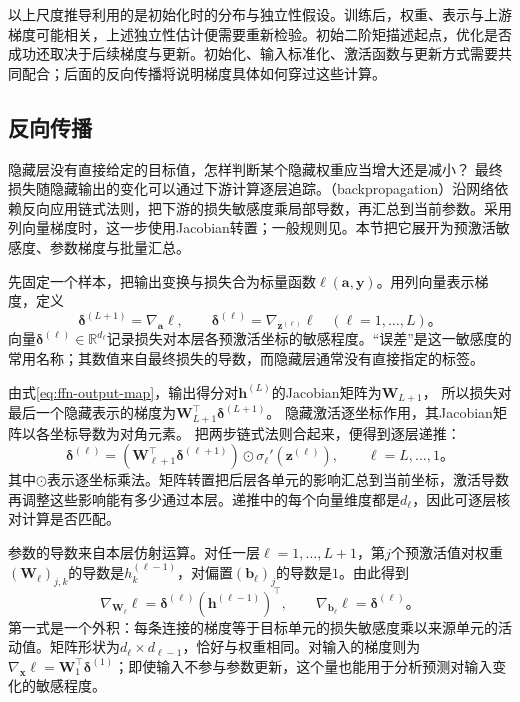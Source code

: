 以上尺度推导利用的是初始化时的分布与独立性假设。训练后，权重、表示与上游梯度可能相关，上述独立性估计便需要重新检验。初始二阶矩描述起点，优化是否成功还取决于后续梯度与更新。初始化、输入标准化、激活函数与更新方式需要共同配合；后面的反向传播将说明梯度具体如何穿过这些计算。

\subsection{反向传播}
\label{sec:ffn-backpropagation}

隐藏层没有直接给定的目标值，怎样判断某个隐藏权重应当增大还是减小？
最终损失随隐藏输出的变化可以通过下游计算逐层追踪。（backpropagation）沿网络依赖反向应用链式法则，把下游的损失敏感度乘局部导数，再汇总到当前参数。采用列向量梯度时，这一步使用Jacobian转置；一般规则见。本节把它展开为预激活敏感度、参数梯度与批量汇总。

先固定一个样本，把输出变换与损失合为标量函数$\ell(\bm{a},\bm{y})$。用列向量表示梯度，定义
\begin{equation}
  \bm{\delta}^{(L+1)}=\nabla_{\bm{a}}\ell,
  \qquad
  \bm{\delta}^{(\ell)}=\nabla_{\bm{z}^{(\ell)}}\ell
  \quad(\ell=1,\ldots,L)\text{。}
  \label{eq:ffn-delta-definition}
\end{equation}
向量$\bm{\delta}^{(\ell)}\in\mathbb{R}^{d_\ell}$记录损失对本层各预激活坐标的敏感程度。“误差”是这一敏感度的常用名称；其数值来自最终损失的导数，而隐藏层通常没有直接指定的标签。

由式\eqref{eq:ffn-output-map}，输出得分对$\bm{h}^{(L)}$的Jacobian矩阵为$\bm{W}_{L+1}$，
所以损失对最后一个隐藏表示的梯度为$\bm{W}_{L+1}^{\top}\bm{\delta}^{(L+1)}$。
隐藏激活逐坐标作用，其Jacobian矩阵以各坐标导数为对角元素。
把两步链式法则合起来，便得到逐层递推：
\begin{equation}
  \bm{\delta}^{(\ell)}=
  \left(\bm{W}_{\ell+1}^{\top}\bm{\delta}^{(\ell+1)}\right)
  \odot\sigma_\ell'\!\left(\bm{z}^{(\ell)}\right),
  \qquad \ell=L,\ldots,1\text{。}
  \label{eq:ffn-backward-recursion}
\end{equation}
其中$\odot$表示逐坐标乘法。矩阵转置把后层各单元的影响汇总到当前坐标，激活导数再调整这些影响能有多少通过本层。递推中的每个向量维度都是$d_\ell$，因此可逐层核对计算是否匹配。

参数的导数来自本层仿射运算。对任一层$\ell=1,\ldots,L+1$，第$j$个预激活值对权重$(\bm{W}_\ell)_{j,k}$的导数是$h_k^{(\ell-1)}$，对偏置$(\bm{b}_\ell)_j$的导数是$1$。由此得到
\begin{equation}
  \nabla_{\bm{W}_\ell}\ell
    =\bm{\delta}^{(\ell)}(\bm{h}^{(\ell-1)})^{\top},
  \qquad
  \nabla_{\bm{b}_\ell}\ell=\bm{\delta}^{(\ell)}\text{。}
  \label{eq:ffn-parameter-gradients}
\end{equation}
第一式是一个外积：每条连接的梯度等于目标单元的损失敏感度乘以来源单元的活动值。矩阵形状为$d_\ell\times d_{\ell-1}$，恰好与权重相同。对输入的梯度则为$\nabla_{\bm{x}}\ell=\bm{W}_1^{\top}\bm{\delta}^{(1)}$；即使输入不参与参数更新，这个量也能用于分析预测对输入变化的敏感程度。

